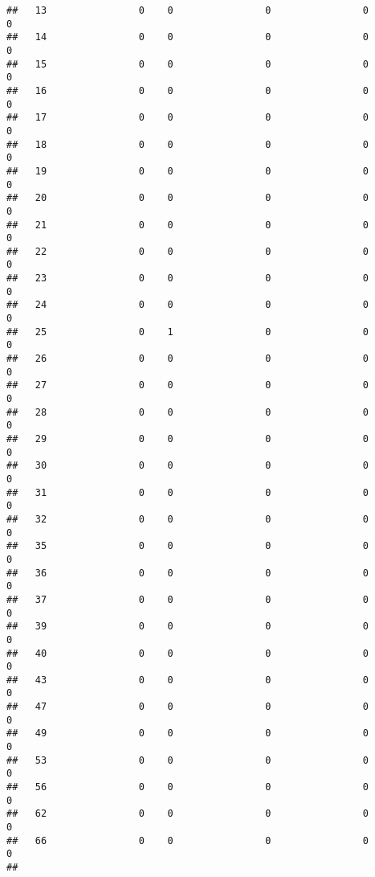 \documentclass[]{article}
\begin{document}
\begin{verbatim}
##   13                0    0                0                0                0
##   14                0    0                0                0                0
##   15                0    0                0                0                0
##   16                0    0                0                0                0
##   17                0    0                0                0                0
##   18                0    0                0                0                0
##   19                0    0                0                0                0
##   20                0    0                0                0                0
##   21                0    0                0                0                0
##   22                0    0                0                0                0
##   23                0    0                0                0                0
##   24                0    0                0                0                0
##   25                0    1                0                0                0
##   26                0    0                0                0                0
##   27                0    0                0                0                0
##   28                0    0                0                0                0
##   29                0    0                0                0                0
##   30                0    0                0                0                0
##   31                0    0                0                0                0
##   32                0    0                0                0                0
##   35                0    0                0                0                0
##   36                0    0                0                0                0
##   37                0    0                0                0                0
##   39                0    0                0                0                0
##   40                0    0                0                0                0
##   43                0    0                0                0                0
##   47                0    0                0                0                0
##   49                0    0                0                0                0
##   53                0    0                0                0                0
##   56                0    0                0                0                0
##   62                0    0                0                0                0
##   66                0    0                0                0                0
##     

\end{verbatim}
\end{document}
